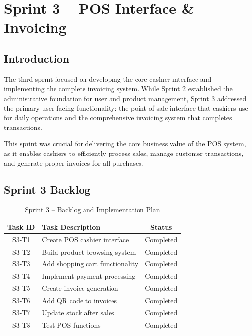 \chapter{Sprint 3 – POS Interface \& Invoicing}

\section{Introduction}

The third sprint focused on developing the core cashier interface and implementing the complete invoicing system. While Sprint 2 established the administrative foundation for user and product management, Sprint 3 addressed the primary user-facing functionality: the point-of-sale interface that cashiers use for daily operations and the comprehensive invoicing system that completes transactions.

This sprint was crucial for delivering the core business value of the POS system, as it enables cashiers to efficiently process sales, manage customer transactions, and generate proper invoices for all purchases.

\section{Sprint 3 Backlog}

\begin{table}[H]
\centering
\begin{tabular}{|c|p{10cm}|c|}
\hline
\textbf{Task ID} & \textbf{Task Description} & \textbf{Status} \\
\hline
S3-T1 & Create POS cashier interface & Completed \\
S3-T2 & Build product browsing system & Completed \\
S3-T3 & Add shopping cart functionality & Completed \\
S3-T4 & Implement payment processing & Completed \\
S3-T5 & Create invoice generation & Completed \\
S3-T6 & Add QR code to invoices & Completed \\
S3-T7 & Update stock after sales & Completed \\
S3-T8 & Test POS functions & Completed \\
\hline
\end{tabular}
\caption{Sprint 3 – Backlog and Implementation Plan}
\label{tab:sprint3-backlog}
\end{table}

